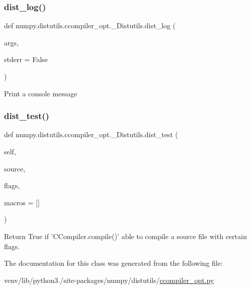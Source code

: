 \subsubsection{\texorpdfstring{dist\+\_\+log()}{dist\_log()}}
{\footnotesize\ttfamily def numpy.\+distutils.\+ccompiler\+\_\+opt.\+\_\+\+Distutils.\+dist\+\_\+log (\begin{DoxyParamCaption}\item[{}]{args,  }\item[{}]{stderr = {\ttfamily False} }\end{DoxyParamCaption})\hspace{0.3cm}{\ttfamily [static]}}

\begin{DoxyVerb}Print a console message\end{DoxyVerb}
 \mbox{\label{classnumpy_1_1distutils_1_1ccompiler__opt_1_1__Distutils_abf0bf519bc13e4cd34d9487f6b6b5b86}} 
\subsubsection{\texorpdfstring{dist\+\_\+test()}{dist\_test()}}
{\footnotesize\ttfamily def numpy.\+distutils.\+ccompiler\+\_\+opt.\+\_\+\+Distutils.\+dist\+\_\+test (\begin{DoxyParamCaption}\item[{}]{self,  }\item[{}]{source,  }\item[{}]{flags,  }\item[{}]{macros = {\ttfamily \mbox{[}\mbox{]}} }\end{DoxyParamCaption})}

\begin{DoxyVerb}Return True if 'CCompiler.compile()' able to compile
a source file with certain flags.
\end{DoxyVerb}
 

The documentation for this class was generated from the following file\+:\begin{DoxyCompactItemize}
\item 
venv/lib/python3./site-\/packages/numpy/distutils/\hyperlink{ccompiler__opt_8py}{ccompiler\+\_\+opt.\+py}\end{DoxyCompactItemize}
